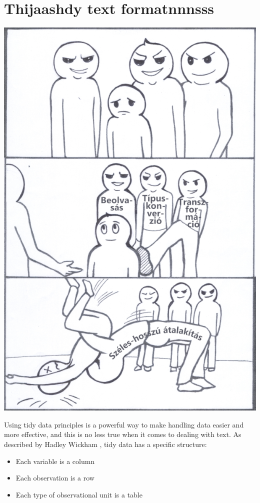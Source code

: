 \documentclass[
]{book}
\providecommand{\tightlist}{%
  \setlength{\itemsep}{0pt}\setlength{\parskip}{0pt}}
\begin{document}
\hypertarget{thijaashdy-text-formatnnnsss}{%
\chapter{Thijaashdy text formatnnnsss}\label{thijaashdy-text-formatnnnsss}}

\begin{center}\includegraphics[width=0.9\linewidth]{images/ch_07_small} \end{center}

Using tidy data principles is a powerful way to make handling data easier and more effective, and this is no less true when it comes to dealing with text. As described by Hadley Wickham \citep{tidydata}, tidy data has a specific structure:

\begin{itemize}
\tightlist
\item
  Each variable is a column
\item
  Each observation is a row
\item
  Each type of observational unit is a table
\end{itemize}
\end{document}
